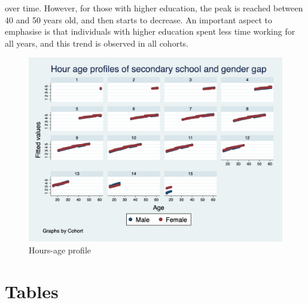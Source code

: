 \documentclass[14pt]{sistedes}
\begin{document}
 over time. However, for those with higher education, the peak is reached between 40 and 50 years old, and then starts
 to decrease. An important aspect to emphasise is that individuals with higher education spent less time working for all
 years, and this trend is observed in all cohorts.
\begin{figure}
    \centering
    \includegraphics[scale=0.3]{graph6.png}
    \caption{Hours-age profile}
    \label{fig:h_cohorts}
\end{figure}
\section{Tables}
\begin{center}
    
    
    
    
    
    
    
\end{center}
\end{document}
